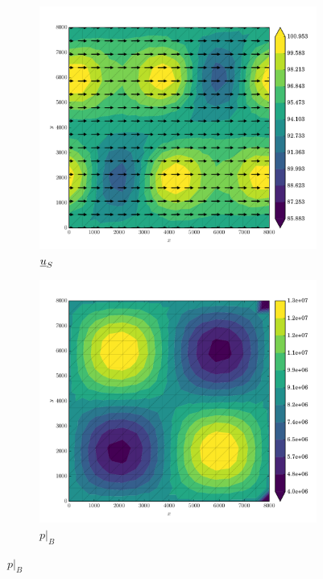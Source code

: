 \begin{figure}
  
  \centering 

  \begin{subfigure}[b]{0.3\linewidth}
    \includegraphics[width=\linewidth]{images/stress_balance/BP/U_mag.pdf}
  \caption{$\underline{u}_S$}
  \label{bp_ms_U}
  \end{subfigure}
  \begin{subfigure}[b]{0.3\linewidth}
    \includegraphics[width=\linewidth]{images/stress_balance/BP/p.pdf}
  \caption{$p |_B$}
  \label{bp_ms_p}
  \end{subfigure}


\end{figure}
